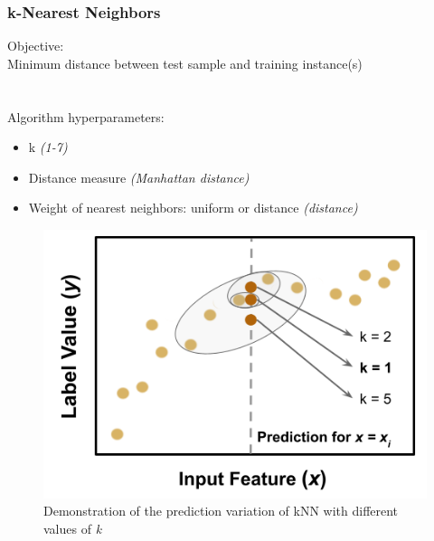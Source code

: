\begin{frame}
  \frametitle{k-Nearest Neighbors}
  \begin{adjustwidth}{-10pt}{0pt}
  \begin{minipage}{0.5\textwidth}
    Objective: \\
    Minimum distance between test sample and training instance(s) \\
    \\~\\
    Algorithm hyperparameters:
    \begin{itemize}
      \item k \textit{(1-7)}
      \item Distance measure \textit{(Manhattan distance)}
      \item Weight of nearest neighbors: uniform or distance \textit{(distance)}
    \end{itemize}
  \end{minipage}%
  \hfill
  \begin{minipage}{0.5\textwidth}
    \begin{figure}
      \centering
      \includegraphics[height=0.5\textheight]{./figures/nn-fig.png}
      \caption{Demonstration of the prediction variation of kNN with different values of \textit{k}}
    \end{figure}
  \end{minipage}
  \end{adjustwidth}
\end{frame}


